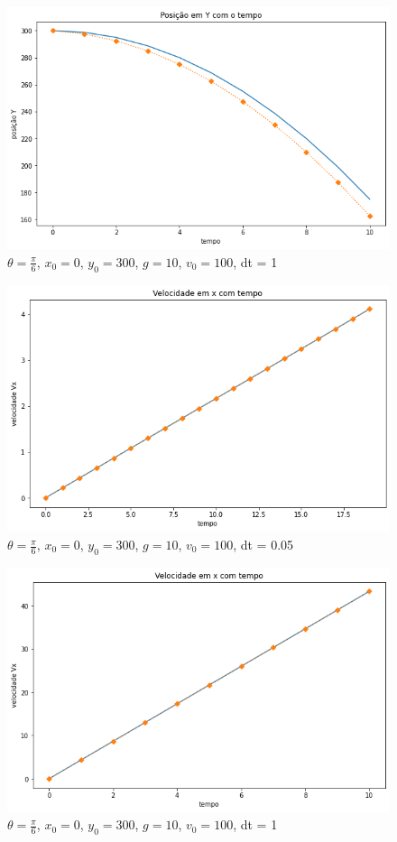 \documentclass[12pt]{article}
\begin{document}
\begin{figure}[H]
  \centering
  \includegraphics[scale = 0.6]{imagens/(blocoemrampa)posicaoydt=1tf=10.png}
  \caption{$\theta = \frac{\pi}{6}$, $x_0 = 0$, $y_0 = 300$, $g = 10$, $v_0 = 100$, dt = 1}
\end{figure}
\begin{figure}[H]
  \centering
  \includegraphics[scale = 0.6]{imagens/(blocoemrampa)velocidadexdt=0.05tf=1.png}
  \caption{$\theta = \frac{\pi}{6}$, $x_0 = 0$, $y_0 = 300$, $g = 10$, $v_0 = 100$, dt = 0.05}
\end{figure}
\begin{figure}[H]
  \centering
  \includegraphics[scale = 0.6]{imagens/(blocoemrampa)velocidadexdt=1tf=10.png}
  \caption{$\theta = \frac{\pi}{6}$, $x_0 = 0$, $y_0 = 300$, $g = 10$, $v_0 = 100$, dt = 1}
\end{figure}
\end{document}
